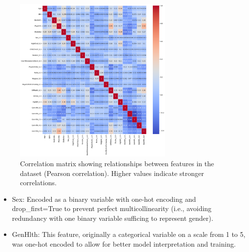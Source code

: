 \documentclass[a4paper,12pt]{article}
\begin{document}
\begin{figure}[H]
    \centering
    \includegraphics[width=0.7\textwidth]{correlation_matrix.png}
    \caption{Correlation matrix showing relationships between features in the dataset (Pearson correlation). 
    Higher values indicate stronger correlations.}
    \label{fig:correlation_matrix}
\end{figure}

\begin{itemize}
    \item Sex: Encoded as a binary variable with one-hot encoding and drop\_first=True to prevent
    perfect multicollinearity (i.e., avoiding redundancy with one binary variable sufficing to 
    represent gender).
    \item GenHlth: This feature, originally a categorical variable on a scale from 1 to 5, 
    was one-hot encoded to allow for better model interpretation and training.
\end{itemize}
\end{document}

